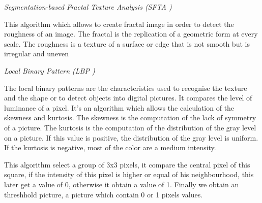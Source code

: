 \textit{Segmentation-based Fractal Texture Analysis (SFTA )}

This algorithm which allows to create fractal image in order to detect the
roughness of an image. The fractal is the replication of a geometric form at every scale.
The roughness is a texture of a surface or edge that is not smooth but is irregular and uneven
    
\textit{Local Binary Pattern (LBP )}

The local binary patterns are the characteristics used to recognise the texture and the shape or to detect
objects into digital pictures. It compares the level of luminance of a pixel.
It's an algorithm which allows the calculation of the skewness and kurtosis.
The skewness is the computation of the lack of symmetry of a picture.
The kurtosis is the computation of the distribution of the gray level on a picture. If this value is positive,
the distribution of the gray level is uniform. If the kurtosis is negative, most of the color are a
medium intensity.

This algorithm select a group of 3x3 pixels, it compare the central pixel of this square, if the intensity of this pixel is higher or equal of his neighbourhood, this later get a value of 0, otherwise it obtain a value of 1.
Finally we obtain an threshhold picture, a picture which contain 0 or 1 pixels values.

    
    